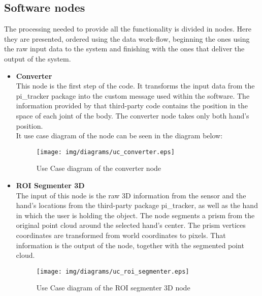 \subsection{Software nodes}

The processing needed to provide all the functionality is divided in nodes. Here they are presented, ordered using the data work-flow, beginning the ones using the raw input data to the system and finishing with the ones that deliver the output of the system. 
\\

\begin{itemize}
	\item{\textbf{\large Converter}}\\
This node is the first step of the code. It transforms the input data from the pi\_tracker package into the custom message used within the software. The information provided by that third-party code contains the position in the space of each joint of the body. The converter node takes only both hand's position. 
\\

It use case diagram of the node can be seen in the diagram below: 

\begin{figure}[h]
	\begin{center}
\texttt{[image: img/diagrams/uc\_converter.eps]}
	\caption[Use case diagram converter node]{Use Case diagram of the converter node}
	\end{center}
\end{figure}

	
	\item{\textbf{ROI Segmenter 3D}}\\
The input of this node is the raw 3D information from the sensor and the hand's locations from the third-party package pi\_tracker, as well as the hand in which the user is holding the object. The node segments a prism from the original point cloud around the selected hand's center. The prism vertices coordinates are transformed from world coordinates to pixels. That information is the output of the node, together with the segmented point cloud. 

\begin{figure}[h]
	\begin{center}
\texttt{[image: img/diagrams/uc\_roi\_segmenter.eps]}
	\caption[Use case diagram ROI segmenter 3D node]{Use Case diagram of the ROI segmenter 3D node}
	\end{center}
\end{figure}
 

\end{itemize}

